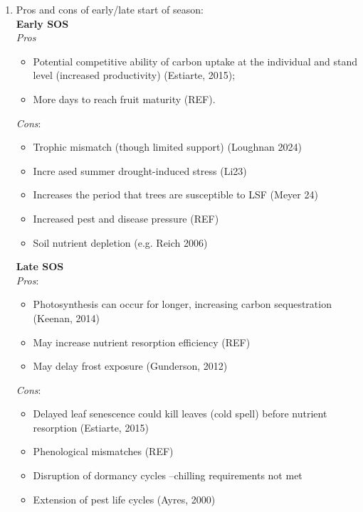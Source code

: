 \documentclass{article}
\begin{document}
\begin{enumerate}
	\item Pros and cons of early/late start of season: \\  %
		\textbf{Early SOS}\\
		\textit{Pros} 
			\begin {itemize}
				\item Potential competitive ability of carbon uptake at the individual and stand level (increased productivity) (Estiarte, 2015); 
				\item More days to reach fruit maturity (REF). 
			\end {itemize}
		\textit{Cons}: 
			\begin {itemize}
				\item Trophic mismatch (though limited support) (Loughnan 2024)
				\item Incre	ased summer drought-induced stress (Li23)
				\item Increases the period that trees are susceptible to LSF (Meyer 24)
				\item Increased pest and disease pressure (REF)
				\item Soil nutrient depletion (e.g. Reich 2006)
			\end {itemize}
		\textbf{Late SOS} \\
		\textit{Pros}: 
			\begin {itemize}
				\item Photosynthesis can occur for longer, increasing carbon sequestration (Keenan, 2014) 
				\item May increase nutrient resorption efficiency (REF)
				\item May delay frost exposure (Gunderson, 2012)
			\end {itemize}
		\textit{Cons}: 
			\begin {itemize}
				\item Delayed leaf senescence could kill leaves (cold spell) before nutrient resorption (Estiarte, 2015)
				\item Phenological mismatches (REF)
				\item Disruption of dormancy cycles --chilling requirements not met
				\item Extension of pest life cycles (Ayres, 2000)
			\end {itemize}
\end{enumerate}

\end{document}
